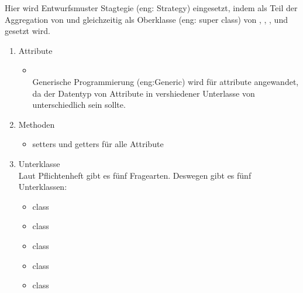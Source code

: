 \documentclass[a4paper]{scrreprt}
\begin{document}
                    Hier wird Entwurfsmuster Stagtegie (eng: Strategy) eingesetzt, indem  als Teil der Aggregation von  und gleichzeitig als Oberklasse (eng: super class) von , , ,  und  gesetzt wird.
                    \begin{enumerate}
                        \item Attribute
                            \begin{itemize}
                                \item {}\\
                                    Generische Programmierung (eng:Generic) wird für attribute  angewandet, da der Datentyp von Attribute  in vershiedener Unterlasse von  unterschiedlich sein sollte.
                            \end{itemize}
                        \item Methoden
                            \begin{itemize}
                                \item setters und getters für alle Attribute
                            \end{itemize}
                        \item Unterklasse\\
                            Laut Pflichtenheft gibt es fünf Fragearten. Deswegen gibt es fünf Unterklassen:
                            \begin{itemize}
                                \item class 
                                \item class 
                                \item class 
                                \item class 
                                \item class 
                            \end{itemize}
                    \end{enumerate}
\end{document}
